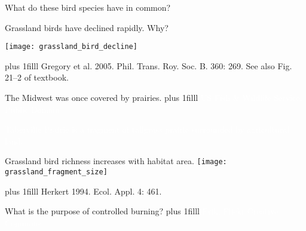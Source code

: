 \documentclass[t]{beamer}
\newcommand\imagecredit[1]{%
	\vskip0pt plus 1filll \tiny #1}%
\begin{document}
{
\begin{frame}[t,plain]{What do these bird species have in common?}


	
	
	
	
\end{frame}
}

{
\begin{frame}[t,plain]{Grassland birds have declined rapidly.  Why?}
	\begin{center}
		\texttt{[image: grassland\_bird\_decline]}
	\end{center}

	\imagecredit{\hfill Gregory et al. 2005. Phil. Trans. Roy. Soc. B. 360: 269. See also Fig. 21--2 of textbook.}
\end{frame}
}

{
\begin{frame}[t,plain]{The Midwest was once covered by prairies.}
	\imagecredit{\hfill\textcolor{white}{US Fish \& Wildlife Service, Public Domain}}
\end{frame}
}

{
\begin{frame}[t,plain]{\textcolor{white}{Taberville Prairie is a fragment of tallgrass prairie surrounded by agricultural land.}}
\end{frame}
}

{
\begin{frame}[t,plain]{Grassland bird richness increases with habitat area.}
	\centering
		\texttt{[image: grassland\_fragment\_size]}

	\imagecredit{\hfill Herkert 1994. Ecol. Appl. 4: 461.}
\end{frame}
}

{
\begin{frame}[t,plain]{What is the purpose of controlled burning?}
	\imagecredit{\hfill\textcolor{white}{Erik, Flickr Creative Commons.}}
\end{frame}
}
\end{document}
